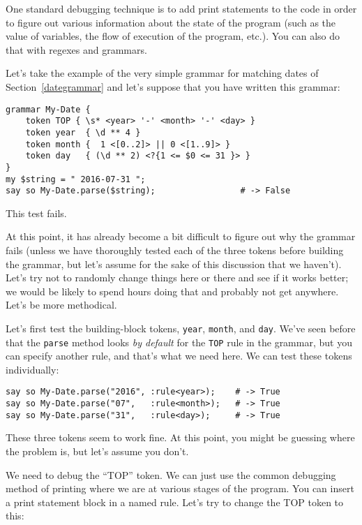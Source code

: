 One standard debugging technique is to add print statements 
to the code in order to figure out various information about 
the state of the program (such as the value of variables, the 
flow of execution of the program, etc.). You can also do that 
with regexes and grammars.

Let's take the example of the very simple grammar for 
matching dates of Section~\ref{dategrammar} and let's suppose 
that you have written this grammar:

\begin{verbatim}
grammar My-Date {
    token TOP { \s* <year> '-' <month> '-' <day> }
    token year  { \d ** 4 }                                        
    token month {  1 <[0..2]> || 0 <[1..9]> }                
    token day   { (\d ** 2) <?{1 <= $0 <= 31 }> }  
}                         
my $string = " 2016-07-31 ";
say so My-Date.parse($string);                 # -> False
\end{verbatim}

This test fails.

At this point, it has already become a bit difficult to figure 
out why the grammar fails (unless we have thoroughly tested 
each of the three tokens before building the grammar, but 
let's assume for the sake of this discussion that we haven't).
Let's try not to randomly change things here or there and see 
if it works better; we would be likely to spend hours doing 
that and probably not get anywhere. Let's be more methodical.

Let's first test the building-block tokens, {\tt year}, 
{\tt month}, and {\tt day}. We've seen before that 
the {\tt parse} method looks \emph{by default} for the {\tt TOP} 
rule in the grammar, but you can specify another rule, and 
that's what we need here. We can test these tokens individually:

\begin{verbatim}
say so My-Date.parse("2016", :rule<year>);    # -> True
say so My-Date.parse("07",   :rule<month>);   # -> True
say so My-Date.parse("31",   :rule<day>);     # -> True
\end{verbatim}

These three tokens seem to work fine. At this point, you 
might be guessing where the problem is, but let's assume 
you don't.

We need to debug the ``TOP'' token. We can just use the common 
debugging method of printing where we are at various stages 
of the program. You can insert a print statement block 
in a named rule. Let's try to change the TOP token to this:

